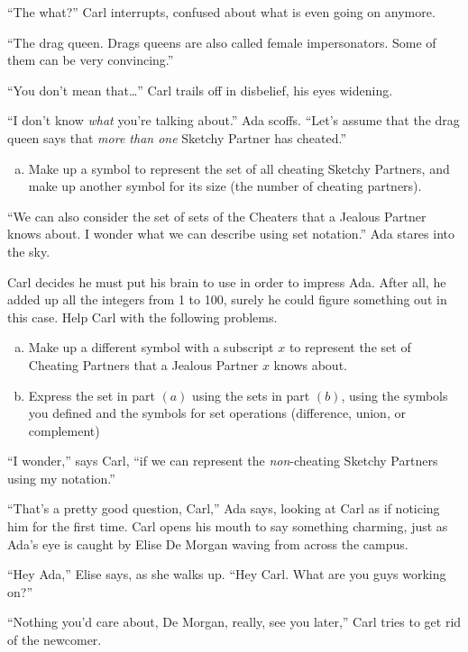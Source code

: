 \documentclass{article}
\begin{document}
``The what?'' Carl interrupts, confused about what is even going on anymore.

``The drag queen. Drags queens are also called female impersonators.
Some of them can be very convincing.''

``You don't mean that\ldots'' Carl trails off in disbelief, his eyes
widening.

``I don't know \emph{what} you're talking about.'' Ada scoffs.
``Let's assume that the drag queen says that \emph{more than one}
Sketchy Partner has cheated.''

\begin{enumerate}[(a)]
\item
Make up a symbol to represent the set of all cheating Sketchy Partners,
and make up another symbol for its size (the number of cheating partners).
\end{enumerate}

``We can also consider the set of sets of the Cheaters that a
Jealous Partner knows about. I wonder what we can describe
using set notation.'' Ada stares into the sky.

Carl decides he must put his brain to use in order to impress
Ada. After all, he added up all the integers from 1 to
100, surely he could figure something out in this case.
Help Carl with the following problems.

\begin{enumerate}[(b)]
\item
Make up a different symbol with a subscript $x$ to represent the
set of Cheating Partners that a Jealous Partner $x$ knows about.
\item
Express the set in part $(a)$ using the sets in part $(b)$,
using the symbols you defined and the symbols for set operations
(difference, union, or complement)
\end{enumerate}

``I wonder,'' says Carl, ``if we can represent the
\emph{non}-cheating Sketchy Partners using my notation.''

``That's a pretty good question, Carl,'' Ada says,
looking at Carl as if noticing him for the first time.
Carl opens his mouth to say something charming, just
as Ada's eye is caught by Elise De Morgan waving from across
the campus.

``Hey Ada,'' Elise says, as she walks up. ``Hey Carl.
What are you guys working on?''

``Nothing you'd care about, De Morgan,
really, see you later,''
Carl tries to get rid of the newcomer.
\end{document}
